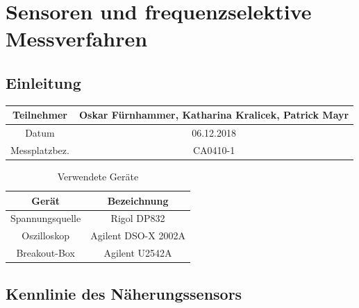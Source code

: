 \chapter{Sensoren und frequenzselektive Messverfahren}

\section{Einleitung}

\begin{table}[!h]
	\centering
	\begin{tabular}{|c|c|}
		\hline 
		Teilnehmer 		& Oskar Fürnhammer, Katharina Kralicek, Patrick Mayr \\
		\hline 
		Datum 		& 06.12.2018 \\ 
		\hline 
		Messplatzbez. 	& CA0410-1 \\
		\hline
	\end{tabular} 
\end{table}

\begin{table}[!h]
	\centering
	\begin{tabular}{ c | c }

Gerät				& Bezeichnung		\\
\hline

Spannungsquelle		& Rigol DP832			\\
Oszilloskop			& Agilent DSO-X 2002A		\\
Breakout-Box		& Agilent U2542A 			\\

	\end{tabular}

	\caption{Verwendete Geräte}
\end{table}

\newpage

\section{Kennlinie des Näherungssensors}

